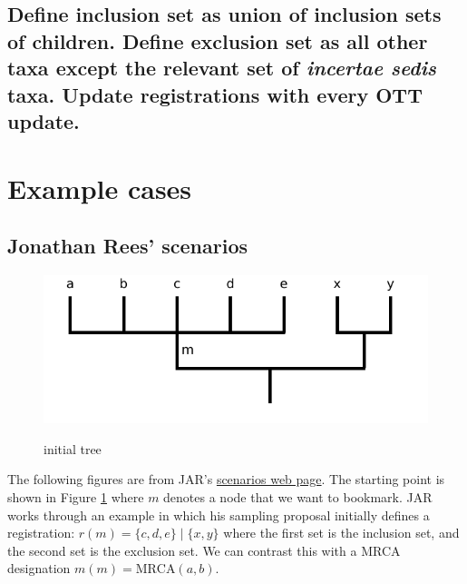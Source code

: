 \documentclass[11pt]{article}
\newcommand{\registration}[3]{{\ensuremath{r(#1)=\{#2\}\mid\{#3\}}}\xspace}
\newcommand{\mrcaDesig}[3]{{\ensuremath{m(#1)=\mbox{MRCA}(#2, #3)}}\xspace}
\begin{document}
\subsection{Define inclusion set as union of inclusion sets of children. Define 
exclusion set as all other taxa except the relevant set of {\em incertae sedis} 
taxa.
Update registrations with every OTT update.}


\section{Example cases}
\subsection{Jonathan Rees' scenarios}
\begin{figure}[h!]
   \centering \includegraphics[scale=.5]{images/jar-example.pdf}\\
   \caption{initial tree}\label{jarInitialTree}
\end{figure}
The following figures are from JAR's \href{https://rawgit.com/OpenTreeOfLife/reference-taxonomy/registry/registry/doc/scenarios.html}{scenarios web page}.
The starting point is shown in Figure \ref{jarInitialTree} where
$m$ denotes a node that we want to bookmark.
JAR works through an example in which his sampling proposal
  initially defines a registration: \registration{m}{c,d,e}{x,y} where the
  first set is the inclusion set, and the second set is the exclusion set.
We can contrast this with a MRCA designation \mrcaDesig{m}{a}{b}.
\end{document}
